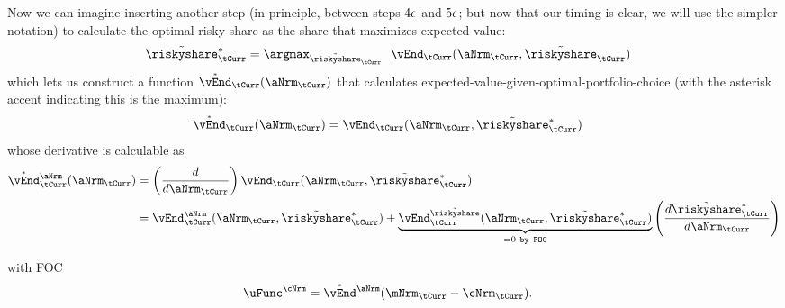 \documentclass[./SolvingMicroDSOPs]{subfiles}
\begin{document}
Now we can imagine inserting another step (in principle, between steps $4\epsilon$ and $5\epsilon$; but now that our timing is clear, we will use the simpler notation) to calculate the optimal risky share as the share that maximizes expected value:
\begin{align}
  \Rend{\riskyshare}_{\tCurr}^{*} & = \argmax_{\Rend{\riskyshare}_{\tCurr}} ~~\vEnd_{\tCurr}(\aNrm_{\tCurr},\Rend{\riskyshare}_{\tCurr})
\end{align}
which lets us construct a function $\Maxed{\vEnd}_{\tCurr}(\aNrm_{\tCurr})$ that calculates expected-value-given-optimal-portfolio-choice (with the asterisk accent indicating this is the maximum):
\begin{align}
   \Maxed{\vEnd}_{\tCurr}(\aNrm_{\tCurr}) & = \vEnd_{\tCurr}(\aNrm_{\tCurr},\Rend{\riskyshare}_{\tCurr}^{*})       
\end{align}
whose derivative is calculable as
\begin{align}
  \Maxed{\vEnd}_{\tCurr}^{\aNrm}(\aNrm_{\tCurr}) & = \left(\frac{d}{d \aNrm_{\tCurr}}\right) \vEnd_{\tCurr}(\aNrm_{\tCurr},\Rend{\riskyshare}_{\tCurr}^{*}) 
  \\ & = \vEnd_{\tCurr}^{\aNrm}(\aNrm_{\tCurr},\Rend{\riskyshare}_{\tCurr}^{*})+\underbrace{
       \vEnd_{\tCurr}^{\Rend{\riskyshare}}(\aNrm_{\tCurr},\Rend{\riskyshare}_{\tCurr}^{*})}_{=0~\texttt{by FOC}}\left(\frac{d \Rend{\riskyshare}_{\tCurr}^{*}}{d \aNrm_{\tCurr}}\right) \notag
\end{align}


with FOC
\begin{align}
  \uFunc^{\cNrm} & = \Maxed{\vEnd}^{\aNrm}(\mNrm_{\tCurr}-\cNrm_{\tCurr}) \label{eq:FOCRoman}.
\end{align}
\end{document}
